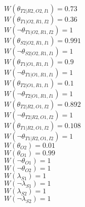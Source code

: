 $W(\theta_{T2|R2,O2,I1})=0.73$\\
$W(\theta_{T1|O2,R1,I2})=0.36$\\
$W(\neg\theta_{T1|O2,R1,I2})=1$\\
$W(\theta_{S2|O2,R1,I1})=0.991$\\
$W(\neg\theta_{S2|O2,R1,I1})=1$\\
$W(\theta_{T1|O1,R1,I1})=0.9$\\
$W(\neg\theta_{T1|O1,R1,I1})=1$\\
$W(\theta_{T2|O1,R1,I1})=0.1$\\
$W(\neg\theta_{T2|O1,R1,I1})=1$\\
$W(\theta_{T2|R2,O1,I2})=0.892$\\
$W(\neg\theta_{T2|R2,O1,I2})=1$\\
$W(\theta_{T1|R2,O1,I2})=0.108$\\
$W(\neg\theta_{T1|R2,O1,I2})=1$\\
$W(\theta_{O2})=0.01$\\
$W(\theta_{O1})=0.99$\\
$W(\neg\theta_{O1})=1$\\
$W(\neg\theta_{O2})=1$\\
$W(\lambda_{S1})=1$\\
$W(\neg\lambda_{S1})=1$\\
$W(\lambda_{S2})=1$\\
$W(\neg\lambda_{S2})=1$\\

